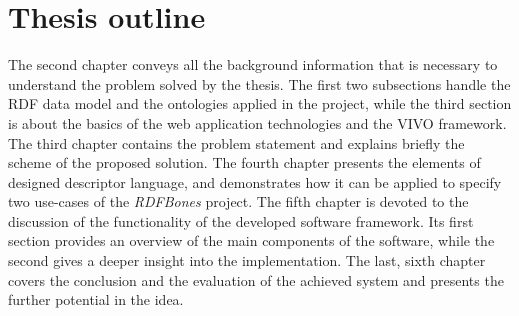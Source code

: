 \section{Thesis outline}

The second chapter conveys all the background information that is necessary to understand the problem solved by the thesis. The first two subsections handle the RDF data model and the ontologies applied in the project, while the third section is about the basics of the web application technologies and the VIVO framework. The third chapter contains the problem statement and explains briefly the scheme of the proposed solution. The fourth chapter presents the elements of designed descriptor language, and demonstrates how it can be applied to specify two use-cases of the \textit{RDFBones} project. The fifth chapter is devoted to the discussion of the functionality of the developed software framework. Its first section provides an overview of the main components of the software, while the second gives a deeper insight into the implementation. The last, sixth chapter covers the conclusion and the evaluation of the achieved system and presents the further potential in the idea.